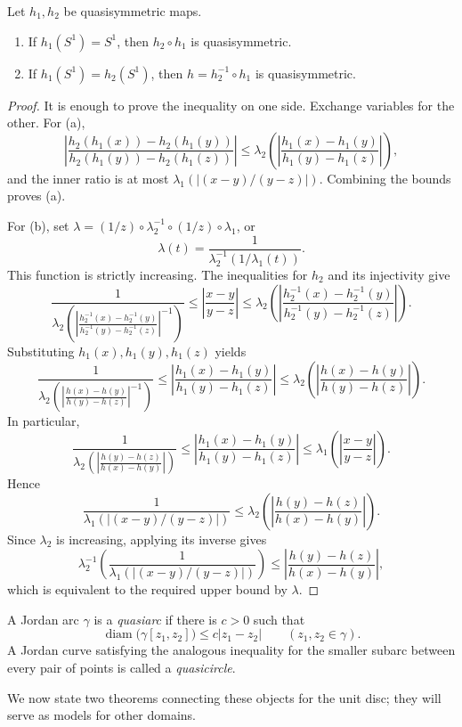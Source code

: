 \documentclass[11pt,a4paper]{article}
\begin{document}
\setcounter{theorem}{40}\begin{proposition}
Let \(h_1,h_2\) be quasisymmetric maps.
\begin{enumerate}[label=(\alph*)]
\setcounter{enumi}{0}\item If \(h_1(S^1)=S^1\), then \(h_2\circ h_1\) is quasisymmetric.
\setcounter{enumi}{1}\item If \(h_1(S^1)=h_2(S^1)\), then \(h=h_2^{-1}\circ h_1\) is quasisymmetric.
\end{enumerate}
\end{proposition}
\begin{proof}
It is enough to prove the inequality on one side. Exchange variables for the other. For (a),
\[
\left|\frac{h_2(h_1(x))-h_2(h_1(y))}
{h_2(h_1(y))-h_2(h_1(z))}\right|
\le\lambda_2\left(\left|\frac{h_1(x)-h_1(y)}
{h_1(y)-h_1(z)}\right|\right),
\]
and the inner ratio is at most \(\lambda_1(|(x-y)/(y-z)|)\). Combining the bounds proves (a).

For (b), set
\(\lambda=(1/z)\circ\lambda_2^{-1}\circ(1/z)\circ\lambda_1\), or
\[
\lambda(t)=\frac1{\lambda_2^{-1}(1/\lambda_1(t))}.
\]
This function is strictly increasing. The inequalities for \(h_2\) and its injectivity give
\[
\frac1{\lambda_2\!\left(
\left|\frac{h_2^{-1}(x)-h_2^{-1}(y)}
{h_2^{-1}(y)-h_2^{-1}(z)}\right|^{-1}\right)}
\le\left|\frac{x-y}{y-z}\right|
\le\lambda_2\!\left(
\left|\frac{h_2^{-1}(x)-h_2^{-1}(y)}
{h_2^{-1}(y)-h_2^{-1}(z)}\right|\right).
\]
Substituting \(h_1(x),h_1(y),h_1(z)\) yields
\[
\frac1{\lambda_2\!\left(
\left|\frac{h(x)-h(y)}{h(y)-h(z)}\right|^{-1}\right)}
\le\left|\frac{h_1(x)-h_1(y)}{h_1(y)-h_1(z)}\right|
\le\lambda_2\!\left(\left|\frac{h(x)-h(y)}{h(y)-h(z)}\right|\right).
\]
In particular,
\[
\frac1{\lambda_2\!\left(
\left|\frac{h(y)-h(z)}{h(x)-h(y)}\right|\right)}
\le\left|\frac{h_1(x)-h_1(y)}{h_1(y)-h_1(z)}\right|
\le\lambda_1\left(\left|\frac{x-y}{y-z}\right|\right).
\]
Hence
\[
\frac1{\lambda_1(|(x-y)/(y-z)|)}
\le\lambda_2\left(\left|\frac{h(y)-h(z)}{h(x)-h(y)}\right|\right).
\]
Since \(\lambda_2\) is increasing, applying its inverse gives
\[
\lambda_2^{-1}\left(\frac1{\lambda_1(|(x-y)/(y-z)|)}\right)
\le\left|\frac{h(y)-h(z)}{h(x)-h(y)}\right|,
\]
which is equivalent to the required upper bound by \(\lambda\).
\end{proof}
\setcounter{definition}{25}\begin{definition}[Quasiarcs]
A Jordan arc \(\gamma\) is a \emph{quasiarc} if there is \(c>0\) such that
\[
\operatorname{diam}\bigl(\gamma[z_1,z_2]\bigr)\le c|z_1-z_2|
\qquad(z_1,z_2\in\gamma).
\]
A Jordan curve satisfying the analogous inequality for the smaller subarc between every pair of points is called a \emph{quasicircle}.
\end{definition}
We now state two theorems connecting these objects for the unit disc; they will serve as models for other domains.
\end{document}

